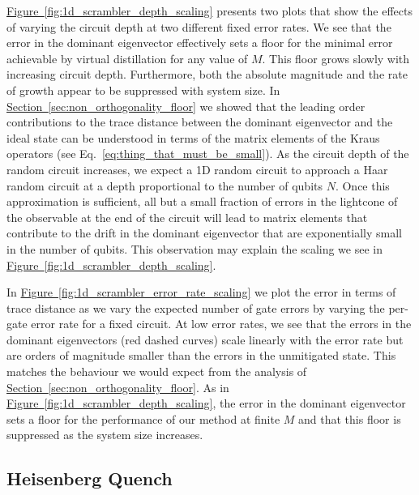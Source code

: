 \documentclass[
amsmath,
amssymb,
aps,
pra,
reprint,
twocolumn,
superscriptaddress,
longbibliography,
showkeys,
floatfix
]{revtex4-1}
\newcommand{\eq}[1]{Eq.~\hyperref[eq:#1]{\ref*{eq:#1}}}
\renewcommand{\sec}[1]{\hyperref[sec:#1]{Section~\ref*{sec:#1}}}
\newcommand{\fig}[1]{\hyperref[fig:#1]{Figure~\ref*{fig:#1}}}
\begin{document}
\fig{1d_scrambler_depth_scaling} presents two plots that show the effects of
varying the circuit depth at two different fixed error rates.
We see that the error in the dominant eigenvector effectively sets a floor for
the minimal error achievable by virtual distillation for any value of \(M\). 
This floor grows slowly with increasing circuit depth.
Furthermore, both the absolute magnitude and the rate of growth appear to be
suppressed with system size. 
In \sec{non_orthogonality_floor} we showed that the leading order contributions
to the trace distance between the dominant eigenvector and the ideal state can
be understood in terms of the matrix elements of the Kraus operators (see
\eq{thing_that_must_be_small}). 
As the circuit depth of the random circuit increases, we expect a 1D random
circuit to approach a Haar random circuit at a depth proportional to the number
of qubits $N$. 
Once this approximation is sufficient, all but a small fraction of errors in the
lightcone of the observable at the end of the circuit will lead to matrix
elements that contribute to the drift in the dominant eigenvector that are
exponentially small in the number of qubits.  
This observation may explain the scaling we see in
\fig{1d_scrambler_depth_scaling}. 

In \fig{1d_scrambler_error_rate_scaling} we plot the error in terms of trace
distance as we vary the expected number of gate errors by varying the per-gate
error rate for a fixed circuit.
At low error rates, we see that the errors in the dominant eigenvectors (red
dashed curves) scale linearly with the error rate but are orders of magnitude
smaller than the errors in the unmitigated state.
This matches the behaviour we would expect from the analysis of
\sec{non_orthogonality_floor}. 
As in \fig{1d_scrambler_depth_scaling}, the error in the dominant eigenvector
sets a floor for the performance of our method at finite \(M\) and that this
floor is suppressed as the system size increases. 

\subsection{Heisenberg Quench}
\label{sec:heisenberg_evolution}
\end{document}
